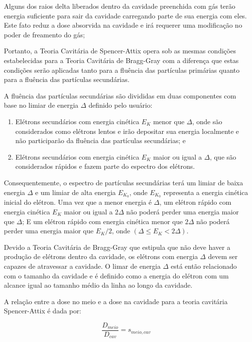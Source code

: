 \documentclass[11pt,a4paper]{article}
\begin{document}
			Alguns dos raios delta liberados dentro da cavidade preenchida com gás terão energia suficiente para sair da cavidade carregando parte de sua energia com eles. Este fato reduz a dose absorvida na cavidade e irá requerer uma modificação no poder de freamento do gás; 

			Portanto, a Teoria Cavitária de Spencer-Attix opera sob as mesmas condições estabelecidas para a Teoria Cavitária de Bragg-Gray com a diferença que estas condições serão aplicadas tanto para a fluência das partículas primárias quanto para a fluência das partículas secundárias.

			A fluência das partículas secundárias são divididas em duas componentes com base no limiar de energia $\Delta$ definido pelo usuário:

			\begin{enumerate}
				\item Elétrons secundários com energia cinética $E_K$ menor que $\Delta$, onde são considerados como elétrons lentos e irão depositar sua energia localmente e não participarão da fluência das partículas secundárias; e
				\item Elétrons secundários com energia cinética $E_K$ maior ou igual a $\Delta$, que são considerados rápidos e fazem parte do espectro dos elétrons. 
			\end{enumerate}

			Consequentemente, o espectro de partículas secundárias terá um limiar de baixa energia $\Delta$ e um limiar de alta energia $E_{K_0}$, onde $E_{K_0}$ representa a energia cinética inicial do elétron. Uma vez que a menor energia é $\Delta$, um elétron rápido com energia cinética $E_{K}$ maior ou igual a $2\Delta$ não poderá perder uma energia maior que $\Delta$; E um elétron rápido com energia cinética menor que $2\Delta$ não poderá perder uma energia maior que $E_K/2$, onde $(\Delta \leq E_K < 2\Delta)$. 

			Devido a Teoria Cavitária de Bragg-Gray que estipula que não deve haver a produção de elétrons dentro da cavidade, os elétrons com energia $\Delta$ devem ser capazes de atravessar a cavidade. O limar de energia $\Delta$ está então relacionado com o tamanho da cavidade e é definido como a energia do elétron com um alcance igual ao tamanho médio da linha ao longo da cavidade. 

			A relação entre a dose no meio e a dose na cavidade para a teoria cavitária Spencer-Attix é dada por:

				\begin{equation}
					\frac{D_{meio}}{D_{cav}} = s_{meio,cav}
				\end{equation}
\end{document}
